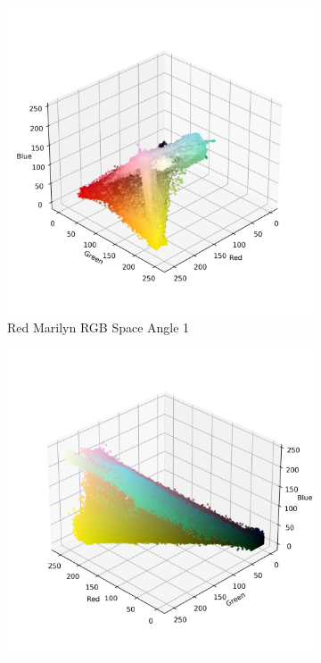 \documentclass{article}
\begin{document}
\begin{figure}[ht]
  \centering
  \begin{subfigure}{0.24\textwidth}
    \includegraphics[width=\textwidth]{main_files/figure-latex/4_5_red_marilyn_original_scatter.jpg}
    \caption{Red Marilyn RGB Space Angle 1}
    \label{fig:4_5_red_marilyn_original_scatter}
  \end{subfigure}
  \hfill
  \begin{subfigure}{0.24\textwidth}
    \includegraphics[width=\textwidth]{main_files/figure-latex/4_6_red_marilyn_original_scatter.jpg}

\end{subfigure}
\end{figure}
\end{document}
